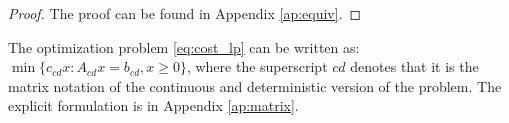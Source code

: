 \documentclass[sigconf, table]{acmart}
\newcommand{\Bat}{\mathcal{B}}
\newcommand{\Ep}{E^+}
\newcommand{\Ene}{E^-}
\newcommand{\ep}{e^+}
\newcommand{\ene}{e^-}
\newcommand{\pricelow}{p^l}
\newcommand{\pricehigh}{p^h}
\newcommand{\ccd}{c_{cd}}
\newcommand{\acd}{A_{cd}}
\newcommand{\bcd}{b_{cd}}
\begin{document}
\begin{proof}

The proof can be found in Appendix \ref{ap:equiv}.





\end{proof}



\begin{proposition}
The optimization problem \eqref{eq:cost_lp} can be written as: $\min\{ \ccd x \colon \acd x = \bcd , x \geq 0\}$, where the superscript $cd$ denotes that it is the matrix notation of the continuous and deterministic version of the problem. The explicit formulation is in Appendix \ref{ap:matrix}.
\end{proposition}
\end{document}

